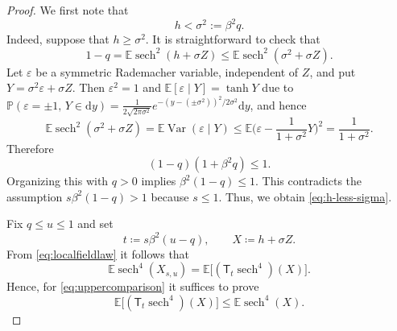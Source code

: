 \documentclass[11pt]{article}
\numberwithin{equation}{section}
\newcommand{\E}{\mathbb{E}}
\newcommand{\1}{\mathbf 1}
\newcommand{\sech}{\operatorname{sech}}
\begin{document}
\begin{proof}
We first note that
\begin{equation}
 h<\sigma^2:=\beta^2    q .
 \label{eq:h-less-sigma}
\end{equation}
Indeed, suppose that $h\ge\sigma^2$. It is straightforward to check that 
\[
 1-q
 =
 \E\sech^2(h+\sigma Z)
 \le
 \E\sech^2(\sigma^2+\sigma Z).
\]
Let $\varepsilon$ be a symmetric Rademacher variable, independent of $Z$,
and put $Y=\sigma^2\varepsilon+\sigma Z$. Then $\varepsilon^2=1$ and 
$\E[\varepsilon\mid Y]=\tanh Y$ due to $\mathbb P(\varepsilon=\pm 1,\,Y\in {\mathrm d}y) = \frac{1}{2\sqrt{2\pi \sigma^2}}e^{-(y - (\pm \sigma^2) )^2/2\sigma^2} {\mathrm d}y$, and hence
\[
 \E\sech^2(\sigma^2+\sigma Z)
 =
 \E\operatorname{Var}(\varepsilon\mid Y)
 \le
\E\Big(\varepsilon-\frac{1}{1+\sigma^2}Y\Big)^2
 =
 \frac{1}{1+\sigma^2}.
\]
Therefore
\[
 (1-q)(1+\beta^2q)\le1.
\]
Organizing this with $q>0$ implies $\beta^2(1-q)\le1$. This contradicts the assumption 
$s\beta^2(1-q)>1$ because $s\le1$.
Thus, we obtain \eqref{eq:h-less-sigma}.

Fix $q\le u\le1$ and set
\[
 t\coloneqq s\beta^2(u-q),
 \qquad
 X\coloneqq h+\sigma Z.
\]
From \eqref{eq:localfieldlaw} it follows that
\[
 \E\sech^4(X_{s,u})
 =
 \E\bigl[(\mathsf T_t\sech^4)(X)\bigr].
\]
Hence, for \eqref{eq:uppercomparison} it suffices to prove
\[
 \E\bigl[(\mathsf T_t\sech^4)(X)\bigr]
 \le
 \E\sech^4(X).
\]




\end{proof}
\end{document}
